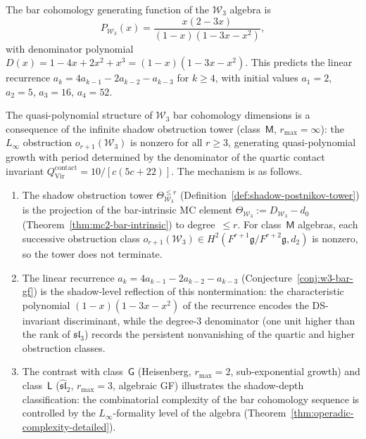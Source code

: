 \begin{conjecture}\label{conj:w3-bar-gf}
The bar cohomology generating function of the $\mathcal{W}_3$ algebra is
\[
P_{\mathcal{W}_3}(x) = \frac{x(2-3x)}{(1-x)(1-3x-x^2)},
\]
with denominator polynomial $D(x) = 1 - 4x + 2x^2 + x^3 = (1-x)(1-3x-x^2)$. This predicts the linear recurrence $a_k = 4a_{k-1} - 2a_{k-2} - a_{k-3}$ for $k \geq 4$, with initial values $a_1 = 2$, $a_2 = 5$, $a_3 = 16$, $a_4 = 52$.
\end{conjecture}

\begin{construction}
\label{constr:combinatorial-frontier-shadow}
The quasi-polynomial structure of $\mathcal{W}_3$ bar cohomology
dimensions is a consequence of the infinite shadow obstruction tower
(class~$\mathsf{M}$, $r_{\max} = \infty$): the $L_\infty$
obstruction $o_{r+1}(\mathcal{W}_3)$ is nonzero for all
$r \geq 3$, generating quasi-polynomial growth with period
determined by the denominator of the quartic contact invariant
$Q^{\mathrm{contact}}_{\mathrm{Vir}} = 10/[c(5c+22)]$.
The mechanism is as follows.
\begin{enumerate}[label=\textup{(\roman*)}]
\item The shadow obstruction tower
 $\Theta_{\mathcal{W}_3}^{\leq r}$
 (Definition~\ref{def:shadow-postnikov-tower}) is the
 projection of the bar-intrinsic MC element
 $\Theta_{\mathcal{W}_3} := D_{\mathcal{W}_3} - d_0$
 (Theorem~\ref{thm:mc2-bar-intrinsic}) to degree~$\leq r$.
 For class~$\mathsf{M}$ algebras, each successive
 obstruction class $o_{r+1}(\mathcal{W}_3)
 \in H^2(F^{r+1}\mathfrak{g}/F^{r+2}\mathfrak{g}, d_2)$
 is nonzero, so the tower does not terminate.
\item The linear recurrence
 $a_k = 4a_{k-1} - 2a_{k-2} - a_{k-3}$
 (Conjecture~\ref{conj:w3-bar-gf}) is the
 shadow-level reflection of this nontermination: the
 characteristic polynomial
 $(1-x)(1-3x-x^2)$ of the recurrence encodes the
 DS-invariant discriminant, while the degree-$3$
 denominator (one unit higher than the rank of
 $\mathfrak{sl}_3$) records the persistent
 nonvanishing of the quartic and higher obstruction
 classes.
\item The contrast with class~$\mathsf{G}$ (Heisenberg,
 $r_{\max} = 2$, sub-exponential growth) and
 class~$\mathsf{L}$ ($\widehat{\mathfrak{sl}}_2$,
 $r_{\max} = 3$, algebraic GF) illustrates the
 shadow-depth classification: the combinatorial complexity
 of the bar cohomology sequence is controlled by the
 $L_\infty$-formality level of the algebra
 (Theorem~\ref{thm:operadic-complexity-detailed}).
\end{enumerate}
\end{construction}

